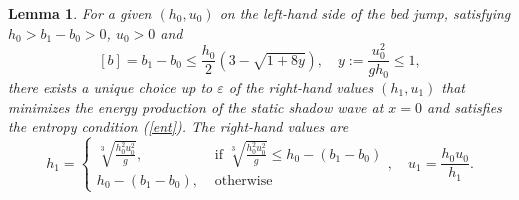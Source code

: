 \documentclass{article}
\theoremstyle{plain}
\newtheorem{lemma}{Lemma}[section]
\theoremstyle{definition}
\theoremstyle{remark}
\begin{document}
\begin{lemma} \label{lemma1}
For a given $(h_{0},u_{0})$ on the left-hand side of the bed jump,
satisfying $h_{0}>b_{1}-b_{0}>0$, $u_{0}>0$ and
\begin{equation}\label{exist}
[b]=b_1-b_0\leq \frac{h_0}{2}(3-\sqrt{1+8y}), \quad y:=\frac{u_0^2}{gh_0}\leq 1,
\end{equation}
there exists a unique choice
up to $\varepsilon$ of the right-hand values $(h_{1},u_{1})$ 
that minimizes the energy
production of the static shadow wave at $x=0$  and satisfies the entropy condition (\ref{ent}).
The right-hand values are 
\begin{equation}\label{opth1}
h_1=\begin{cases}
\sqrt[3]{\frac{h_{0}^{2}u_{0}^{2}}{g}}, & \text{ if }
\sqrt[3]{\frac{h_{0}^{2}u_{0}^{2}}{g}}\leq h_0-(b_1-b_0)\\
h_0-(b_1-b_0), & \text{ otherwise }
\end{cases},\quad u_{1}=\frac{h_{0}u_{0}}{h_{1}}.
\end{equation}

\end{lemma}
\end{document}
